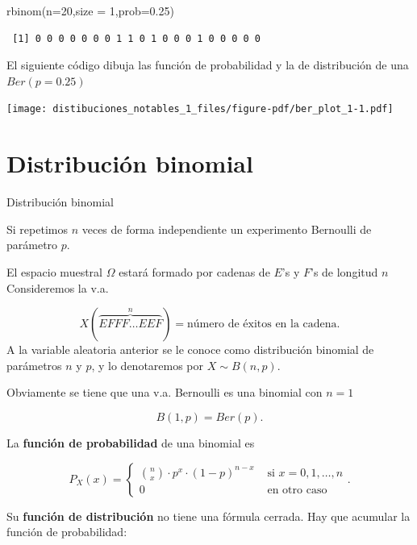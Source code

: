 \documentclass[
  letterpaper,
  DIV=11,
  numbers=noendperiod]{scrreprt}
\newenvironment{Shaded}{\begin{snugshade}}{\end{snugshade}}
\newcommand{\AttributeTok}[1]{\textcolor[rgb]{0.40,0.45,0.13}{#1}}
\newcommand{\DecValTok}[1]{\textcolor[rgb]{0.68,0.00,0.00}{#1}}
\newcommand{\FloatTok}[1]{\textcolor[rgb]{0.68,0.00,0.00}{#1}}
\newcommand{\FunctionTok}[1]{\textcolor[rgb]{0.28,0.35,0.67}{#1}}
\newcommand{\NormalTok}[1]{\textcolor[rgb]{0.00,0.23,0.31}{#1}}
\begin{document}
\begin{Shaded}
\begin{Highlighting}[]
\FunctionTok{rbinom}\NormalTok{(}\AttributeTok{n=}\DecValTok{20}\NormalTok{,}\AttributeTok{size =} \DecValTok{1}\NormalTok{,}\AttributeTok{prob=}\FloatTok{0.25}\NormalTok{)}
\end{Highlighting}
\end{Shaded}

\begin{verbatim}
 [1] 0 0 0 0 0 0 0 1 1 0 1 0 0 0 1 0 0 0 0 0
\end{verbatim}

El siguiente código dibuja las función de probabilidad y la de
distribución de una \(Ber(p=0.25)\)

\begin{center}
\texttt{[image: distibuciones\_notables\_1\_files/figure-pdf/ber\_plot\_1-1.pdf]}
\end{center}

\section{Distribución binomial}\label{distribuciuxf3n-binomial}

Distribución binomial

Si repetimos \(n\) veces de forma independiente un experimento Bernoulli
de parámetro \(p\).

El espacio muestral \(\Omega\) estará formado por cadenas de \(E\)'s y
\(F\)'s de longitud \(n\) Consideremos la v.a.

\[X(\overbrace{EFFF\ldots EEF}^{n})=\mbox{número de éxitos en la cadena}.\]
A la variable aleatoria anterior se le conoce como distribución binomial
de parámetros \(n\) y \(p\), y lo denotaremos por \(X\sim B(n,p).\)

Obviamente se tiene que una v.a. Bernoulli es una binomial con \(n=1\)

\[B(1,p)=Ber(p).\]

La \textbf{función de probabilidad} de una binomial es

\[
P_{X}(x)=\left\{
\begin{array}{ll}
{n\choose x}\cdot  p^x \cdot(1-p)^{n-x} &\mbox{ si } x=0,1,\ldots,n\\
0  & \mbox{ en otro caso}
\end{array}\right..
\]

Su \textbf{función de distribución} no tiene una fórmula cerrada. Hay
que acumular la función de probabilidad:
\end{document}
